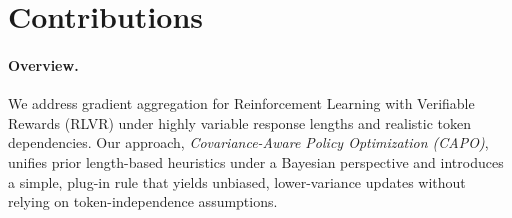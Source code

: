 \section*{Contributions}

\paragraph{Overview.}
We address gradient aggregation for Reinforcement Learning with Verifiable Rewards (RLVR) under highly variable response lengths and realistic token dependencies. Our approach, \emph{Covariance-Aware Policy Optimization (CAPO)}, unifies prior length-based heuristics under a Bayesian perspective and introduces a simple, plug-in rule that yields unbiased, lower-variance updates without relying on token-independence assumptions.

